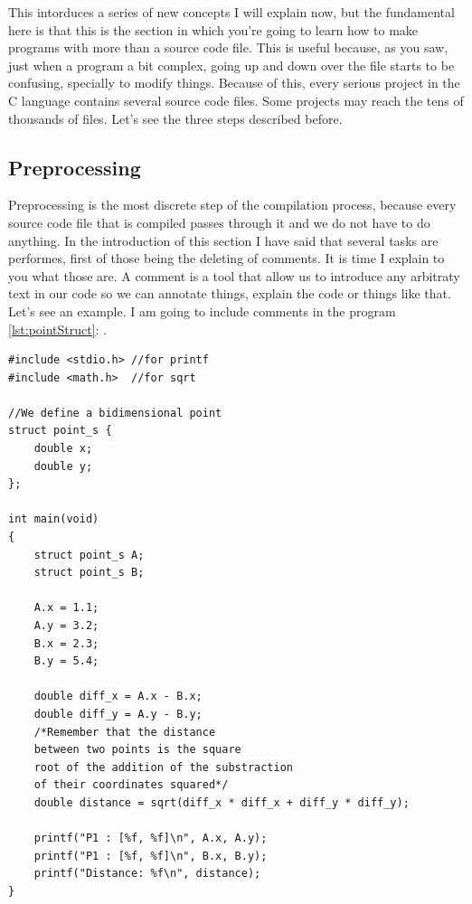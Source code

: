 \documentclass[a4paper]{article}
\begin{document}
This intorduces a series of new concepts I will explain now, but the fundamental
here is that this is the section in which you're going to learn how to make
programs with more than a source code file. This is useful because, as you saw,
just when a program a bit complex, going up and down over the file starts to be
confusing, specially to modify things. Because of this, every serious project
in the C language contains several source code files. Some projects may reach
the tens of thousands of files. Let's see the three steps described before.

\subsection{Preprocessing}

Preprocessing is the most discrete step of the compilation process, because
every source code file that is compiled passes through it and we do not have to
do anything. In the introduction of this section I have said that several tasks
are performes, first of those being the deleting of comments. It is time I
explain to you what those are. A comment is a tool that allow us to introduce
any arbitraty text in our code so we can annotate things, explain the code or
things like that. Let's see an example. I am going to include comments in the
program \ref {lst:pointStruct}: .


\noindent
\begin{minipage}[H]{\linewidth}
\mbox{}
\begin{lstlisting}[style=C,
caption={Example of program with comments},
label={lst:comments1}]
#include <stdio.h> //for printf
#include <math.h>  //for sqrt

//We define a bidimensional point
struct point_s {
    double x;
    double y;
};

int main(void)
{
    struct point_s A;
    struct point_s B;

    A.x = 1.1;
    A.y = 3.2;
    B.x = 2.3;
    B.y = 5.4;

    double diff_x = A.x - B.x;
    double diff_y = A.y - B.y;
    /*Remember that the distance
    between two points is the square
    root of the addition of the substraction
    of their coordinates squared*/
    double distance = sqrt(diff_x * diff_x + diff_y * diff_y);

    printf("P1 : [%f, %f]\n", A.x, A.y);
    printf("P1 : [%f, %f]\n", B.x, B.y);
    printf("Distance: %f\n", distance);
}
\end{lstlisting}
\end{minipage}
\end{document}
